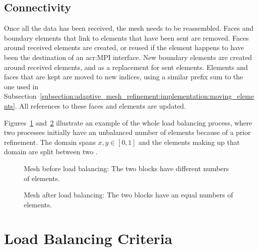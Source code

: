 \subsection{Connectivity}\label{subsection:load_balancing:reconstruction:connectivity}

Once all the data has been received, the mesh needs to be reassembled. Faces and boundary elements
that link to elements that have been sent are removed. Faces around received elements are created,
or reused if the element happens to have been the destination of an \acrshort{acr:MPI} interface.
New boundary elements are created around received elements, and as a replacement for sent elements.
Elements and faces that are kept are moved to new indices, using a similar prefix sum to the one
used in Subsection~\ref{subsection:adaptive_mesh_refinement:implementation:moving_elements}. All
references to these faces and elements are updated.

Figures~\ref{fig:lb_before} and~\ref{fig:lb_after} illustrate an example of the whole load balancing
process, where two processes initially have an unbalanced number of elements because of a prior
refinement. The domain spans \(x, y \in [0, 1]\) and the elements making up that domain are split
between two . 

\begin{figure}[H]
    \centering
    \subfloat[Process 0]
    {\label{fig:lb_before_0}}
    \qquad
    \subfloat[Process 1]
    {\label{fig:lb_before_1}}
    \caption{Mesh before load balancing: The two blocks have different numbers of elements.}\label{fig:lb_before}
\end{figure}

\begin{figure}[H]
    \centering
    \subfloat[Process 0]
    {\label{fig:lb_after_0}}
    \qquad
    \subfloat[Process 1]
    {\label{fig:lb_after_1}}
    \caption{Mesh after load balancing: The two blocks have an equal numbers of elements.}\label{fig:lb_after}
\end{figure}

\section{Load Balancing Criteria}\label{section:load_balancing:criteria}

